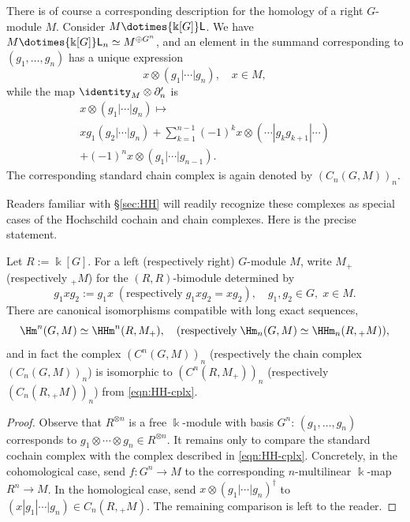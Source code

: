 There is of course a corresponding description for the homology of a right
$G$-module $M$. Consider $M\dotimes{\Bbbk[G]}\mathsf{L}$. We have
$M\dotimes{\Bbbk[G]}\mathsf{L}_n\simeq M^{\oplus G^n}$, and an element in
the summand corresponding to $(g_1,\ldots,g_n)$ has a unique expression
\[ x \otimes (g_1 | \cdots | g_n), \quad x \in M, \]
while the map $\identity_M\otimes\partial'_n$ is
\begin{multline*}
	x \otimes (g_1 | \cdots | g_n) \mapsto \\
	x g_1 (g_2 | \cdots | g_n) + \sum_{k=1}^{n-1} (-1)^k x \otimes (\cdots | g_k g_{k+1} | \cdots) \\
	+ (-1)^n x \otimes (g_1 | \cdots | g_{n-1}).
\end{multline*}
The corresponding standard chain complex is again denoted by
$(C_n(G,M))_n$.

Readers familiar with \S\ref{sec:HH} will readily recognize these complexes
as special cases of the Hochschild cochain and chain complexes. Here is the
precise statement.

\begin{proposition}
	Let $R:=\Bbbk[G]$. For a left (respectively right) $G$-module $M$, write
	$M_+$ (respectively ${}_+M$) for the $(R,R)$-bimodule determined by
	\[ g_1 x g_2 := g_1 x \; (\text{respectively}\; g_1 x g_2 = x g_2 ), \quad g_1 , g_2 \in G, \; x \in M. \]
	There are canonical isomorphisms compatible with long exact sequences,
	\[ \Hm^n(G, M) \simeq \HHm^n(R, M_+), \quad (\text{respectively}\; \Hm_n(G, M) \simeq \HHm_n(R, {}_+ M)), \]
	and in fact the complex $(C^n(G,M))_n$ (respectively the chain complex
	$(C_n(G,M))_n$) is isomorphic to $(C^n(R,M_+))_n$ (respectively
	$(C_n(R,{}_+M))_n$) from \eqref{eqn:HH-cplx}.
\end{proposition}
\begin{proof}
	Observe that $R^{\otimes n}$ is a free $\Bbbk$-module with basis $G^n$:
	$(g_1,\ldots,g_n)$ corresponds to
	$g_1\otimes\cdots\otimes g_n\in R^{\otimes n}$. It remains only to
	compare the standard cochain complex with the complex described in
	\eqref{eqn:HH-cplx}. Concretely, in the cohomological case, send
	$f:G^n\to M$ to the corresponding $n$-multilinear $\Bbbk$-map $R^n\to M$.
	In the homological case, send
	$x\otimes(g_1|\cdots|g_n)^\dagger$ to
	$(x|g_1|\cdots|g_n)\in C_n(R,{}_+M)$. The remaining comparison is left to
	the reader.
\end{proof}

